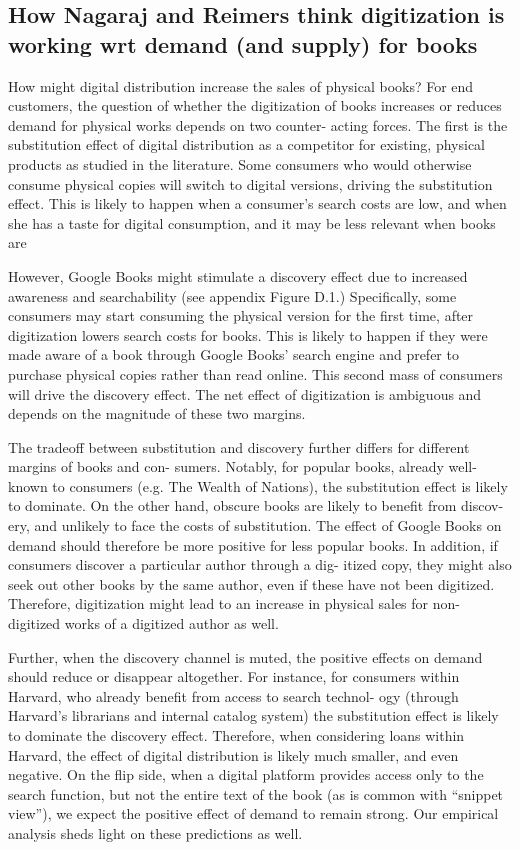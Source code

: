 \documentclass{article}
\begin{document}
\subsection{How Nagaraj and Reimers think digitization is working wrt demand (and supply) for books}
How might digital distribution increase the sales of physical books? For end customers, the question of
whether the digitization of books increases or reduces demand for physical works depends on two counter-
acting forces. The first is the substitution effect of digital distribution as a competitor for existing, physical
products as studied in the literature. Some consumers who would otherwise consume physical copies will
switch to digital versions, driving the substitution effect. This is likely to happen when a consumer’s search
costs are low, and when she has a taste for digital consumption, and it may be less relevant when books are 

However, Google Books might stimulate a discovery effect due to increased awareness and searchability (see appendix Figure D.1.) Specifically, some consumers may start consuming the physical version for the first time, after digitization lowers search costs for books. This is likely to happen if they were made aware of a book through Google Books’ search engine and prefer to purchase physical copies rather than read online. This second mass of consumers will drive the discovery effect. The net effect of digitization is ambiguous and depends on the magnitude of these two margins.

The tradeoff between substitution and discovery further differs for different margins of books and con- sumers. Notably, for popular books, already well-known to consumers (e.g. The Wealth of Nations), the substitution effect is likely to dominate. On the other hand, obscure books are likely to benefit from discov- ery, and unlikely to face the costs of substitution. The effect of Google Books on demand should therefore be more positive for less popular books. In addition, if consumers discover a particular author through a dig- itized copy, they might also seek out other books by the same author, even if these have not been digitized. Therefore, digitization might lead to an increase in physical sales for non-digitized works of a digitized author as well.

Further, when the discovery channel is muted, the positive effects on demand should reduce or disappear altogether. For instance, for consumers within Harvard, who already benefit from access to search technol- ogy (through Harvard’s librarians and internal catalog system) the substitution effect is likely to dominate the discovery effect. Therefore, when considering loans within Harvard, the effect of digital distribution is likely much smaller, and even negative. On the flip side, when a digital platform provides access only to the search function, but not the entire text of the book (as is common with “snippet view”), we expect the positive effect of demand to remain strong. Our empirical analysis sheds light on these predictions as well.
\end{document}
